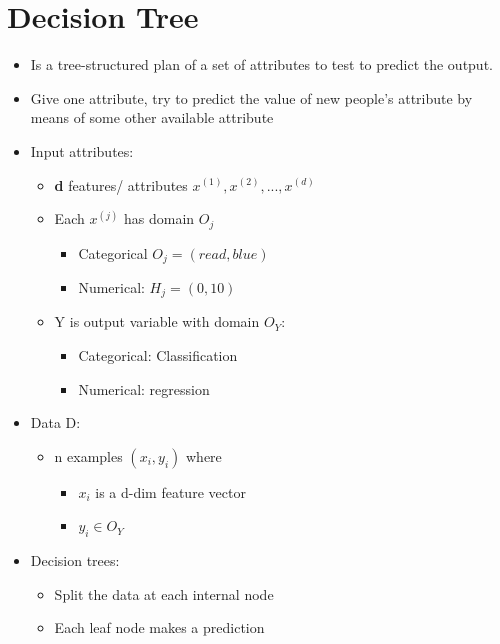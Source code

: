 \documentclass[
]{book}
\providecommand{\tightlist}{%
  \setlength{\itemsep}{0pt}\setlength{\parskip}{0pt}}
\begin{document}
\hypertarget{decision-tree}{%
\section{Decision Tree}\label{decision-tree}}

\begin{itemize}
\item
  Is a tree-structured plan of a set of attributes to test to predict the output.
\item
  Give one attribute, try to predict the value of new people's attribute by means of some other available attribute
\item
  Input attributes:

  \begin{itemize}
  \item
    \textbf{d} features/ attributes \(x^{(1)},x^{(2)},...,x^{(d)}\)
  \item
    Each \(x^{(j)}\) has domain \(O_j\)

    \begin{itemize}
    \tightlist
    \item
      Categorical \(O_j=(read,blue)\)
    \item
      Numerical: \(H_j = (0,10)\)
    \end{itemize}
  \item
    Y is output variable with domain \(O_Y\):

    \begin{itemize}
    \tightlist
    \item
      Categorical: Classification
    \item
      Numerical: regression
    \end{itemize}
  \end{itemize}
\item
  Data D:

  \begin{itemize}
  \item
    n examples \((x_i, y_i)\) where

    \begin{itemize}
    \tightlist
    \item
      \(x_i\) is a d-dim feature vector
    \item
      \(y_i\in O_Y\)
    \end{itemize}
  \end{itemize}
\item
  Decision trees:

  \begin{itemize}
  \tightlist
  \item
    Split the data at each internal node
  \item
    Each leaf node makes a prediction
  \end{itemize}
\end{itemize}
\end{document}
